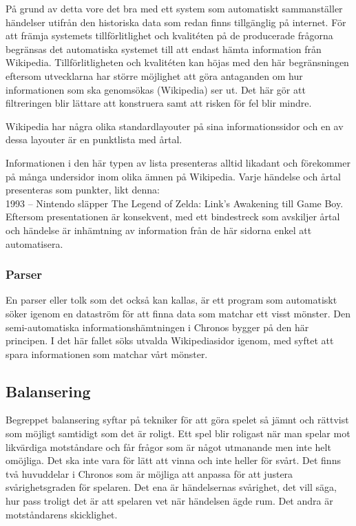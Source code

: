 \documentclass[a4paper, 11pt]{article}
\begin{document}
På grund av detta vore det bra med ett system som automatiskt sammanställer händelser utifrån den historiska data som redan finns tillgänglig på internet. För att främja systemets tillförlitlighet och kvalitéten på de producerade frågorna begränsas det automatiska systemet till att endast hämta information från Wikipedia. Tillförlitligheten och kvalitéten kan höjas med den här begränsningen eftersom utvecklarna har större möjlighet att göra antaganden om hur informationen som ska genomsökas (Wikipedia) ser ut. Det här gör att filtreringen blir lättare att konstruera samt att risken för fel blir mindre.

Wikipedia har några olika standardlayouter på sina informationssidor och en av dessa layouter är en punktlista med årtal. 


Informationen i den här typen av lista presenteras alltid likadant och förekommer på många undersidor inom olika ämnen på Wikipedia. Varje händelse och årtal presenteras som punkter, likt denna:\\



	1993 – Nintendo släpper The Legend of Zelda: Link's Awakening till Game Boy.\\


Eftersom presentationen är konsekvent, med ett bindestreck som avskiljer årtal och händelse är inhämtning av information från de här sidorna enkel att automatisera.

\subsubsection{Parser}
En parser eller tolk som det också kan kallas, är ett program som automatiskt söker igenom en dataström för att finna data som matchar ett visst mönster. Den semi-automatiska informationshämtningen i Chronos bygger på den här principen. I det här fallet söks utvalda Wikipediasidor igenom, med syftet att spara informationen som matchar vårt mönster. 

\subsection{Balansering}
Begreppet balansering syftar på tekniker för att göra spelet så jämnt och rättvist som möjligt samtidigt som det är roligt. Ett spel blir roligast när man spelar mot likvärdiga motståndare och får frågor som är något utmanande men inte helt omöjliga. Det ska inte vara för lätt att vinna och inte heller för svårt. Det finns två huvuddelar i Chronos som är möjliga att anpassa för att justera svårighetsgraden för spelaren. Det ena är händelsernas svårighet, det vill säga, hur pass troligt det är att spelaren vet när händelsen ägde rum. Det andra är motståndarens skicklighet.
\end{document}
